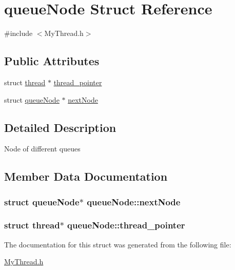 \hypertarget{structqueue_node}{\section{queue\+Node Struct Reference}
\label{structqueue_node}
}


{\ttfamily \#include $<$My\+Thread.\+h$>$}

\subsection*{Public Attributes}
\begin{DoxyCompactItemize}
\item 
struct \hyperlink{structthread}{thread} $\ast$ \hyperlink{structqueue_node_a01f59b19680a8f4cc1a51bcbfd3bebc0}{thread\+\_\+pointer}
\item 
struct \hyperlink{structqueue_node}{queue\+Node} $\ast$ \hyperlink{structqueue_node_a1865d3b54017b84ae04647e3be59b3e1}{next\+Node}
\end{DoxyCompactItemize}


\subsection{Detailed Description}
Node of different queues 

\subsection{Member Data Documentation}
\hypertarget{structqueue_node_a1865d3b54017b84ae04647e3be59b3e1}{
\subsubsection[{next\+Node}]{\setlength{\rightskip}{0pt plus 5cm}struct {\bf queue\+Node}$\ast$ queue\+Node\+::next\+Node}}\label{structqueue_node_a1865d3b54017b84ae04647e3be59b3e1}
\hypertarget{structqueue_node_a01f59b19680a8f4cc1a51bcbfd3bebc0}{
\subsubsection[{thread\+\_\+pointer}]{\setlength{\rightskip}{0pt plus 5cm}struct {\bf thread}$\ast$ queue\+Node\+::thread\+\_\+pointer}}\label{structqueue_node_a01f59b19680a8f4cc1a51bcbfd3bebc0}


The documentation for this struct was generated from the following file\+:\begin{DoxyCompactItemize}
\item 
\hyperlink{_my_thread_8h}{My\+Thread.\+h}\end{DoxyCompactItemize}
